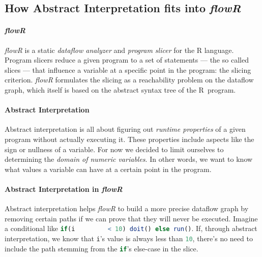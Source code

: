 \documentclass[color,coloraccent=red!60!black,listings]{poster}
\def\flowr{\textit{flowR}}
\def\rc#1{\lstinline[language=r]{#1}}
\begin{document}
\begin{multicols}{3}
	\newlength\currentparskip\setlength\currentparskip\parskip
	\begin{minipage}{\dimexpr2\columnwidth+\columnsep\relax}
		\setlength\parskip\currentparskip%
		\section*{How Abstract Interpretation fits into \flowr}
		\paragraph{\flowr}\flowr{} is a static \emph{dataflow analyzer} and
		\emph{program slicer} for the R language. Program slicers reduce a given program
		to a set of statements --- the so called slices --- that influence a variable at
		a specific point in the program: the slicing criterion. \flowr{} formulates
		the slicing as a reachability problem on the dataflow graph, which itself is
		based on the abstract syntax tree of the R~program.
		\paragraph{Abstract Interpretation} Abstract interpretation is all about
		figuring out \emph{runtime properties} of a given program without actually
		executing it. These properties include aspects like the sign or nullness of a
		variable. For now we decided to limit ourselves to determining the \emph{domain
		of numeric variables}. In other words, we want to know what values a variable
		can have at a certain point in the program.
		\paragraph{Abstract Interpretation in \flowr} Abstract interpretation helps
		\flowr{} to build a more precise dataflow graph by removing certain paths if we
		can prove that they will never be executed. Imagine a conditional like \rc{if(i
		< 10) doit() else run()}. If, through abstract interpretation, we know that
		\rc{i}'s value is always less than \rc{10}, there's no need to include the path
		stemming from the \rc{if}'s else-case in the slice.

\end{minipage}
\end{multicols}
\end{document}
